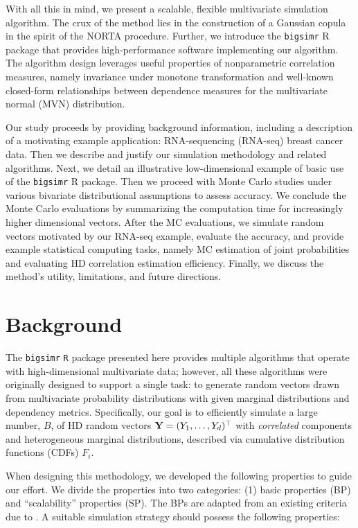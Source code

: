 \documentclass[
]{jss}
\begin{document}
With all this in mind, we present a scalable, flexible multivariate simulation algorithm. The crux of the method lies in the construction of a Gaussian copula in the spirit of the NORTA procedure. Further, we introduce the \texttt{bigsimr} R package that provides high-performance software implementing our algorithm. The algorithm design leverages useful properties of nonparametric correlation measures, namely invariance under monotone transformation and well-known closed-form relationships between dependence measures for the multivariate normal (MVN) distribution.

Our study proceeds by providing background information, including a description of a motivating example application: RNA-sequencing (RNA-seq) breast cancer data. Then we describe and justify our simulation methodology and related algorithms. Next, we detail an illustrative low-dimensional example of basic use of the \texttt{bigsimr} R package. Then we proceed with Monte Carlo studies under various bivariate distributional assumptions to assess accuracy. We conclude the Monte Carlo evaluations by summarizing the computation time for increasingly higher dimensional vectors. After the MC evaluations, we simulate random vectors motivated by our RNA-seq example, evaluate the accuracy, and provide example statistical computing tasks, namely MC estimation of joint probabilities and evaluating HD correlation estimation efficiency. Finally, we discuss the method's utility, limitations, and future directions.

\hypertarget{background}{%
\section{Background}\label{background}}

The \texttt{bigsimr} \texttt{R} package presented here provides multiple algorithms that operate with high-dimensional multivariate data; however, all these algorithms were originally designed to support a single task: to generate random vectors drawn from multivariate probability distributions with given marginal distributions and dependency metrics. Specifically, our goal is to efficiently simulate a large number, \(B\), of HD random vectors \({\bf Y}=(Y_1, \ldots, Y_d)^\top\) with \emph{correlated} components and heterogeneous marginal distributions, described via cumulative distribution functions (CDFs) \(F_i\).

When designing this methodology, we developed the following properties to guide our effort. We divide the properties into two categories: (1) basic properties (BP) and ``scalability'' properties (SP). The BPs are adapted from an existing criteria due to \citet{Nik13a}. A suitable simulation strategy should possess the following properties:
\end{document}
